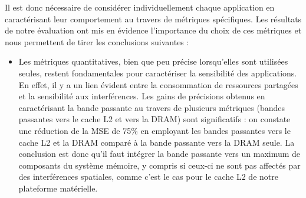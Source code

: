 Il est donc nécessaire de considérer individuellement chaque application en caractérisant leur comportement au travers de métriques spécifiques.
Les résultats de notre évaluation ont mis en évidence l'importance du choix de ces métriques et nous permettent de tirer les conclusions suivantes :

\begin{itemize}

	\item Les métriques quantitatives, bien que peu précise lorsqu'elles sont utilisées seules, restent fondamentales pour caractériser la sensibilité des applications.
	En effet, il y a un lien évident entre la consommation de ressources partagées et la sensibilité aux interférences.
	Les gains de précisions obtenus en caractérisant la bande passante au travers de plusieurs métriques (bandes passantes vers le cache L2 et vers la DRAM) sont significatifs : on constate une réduction de la MSE de 75\% en employant les bandes passantes vers le cache L2 et la DRAM comparé à la bande passante vers la DRAM seule.
	La conclusion est donc qu'il faut intégrer la bande passante vers un maximum de composants du système mémoire, y compris si ceux-ci ne sont pas affectés par des interférences spatiales, comme c'est le cas pour le cache L2 de notre plateforme matérielle.


\end{itemize}
